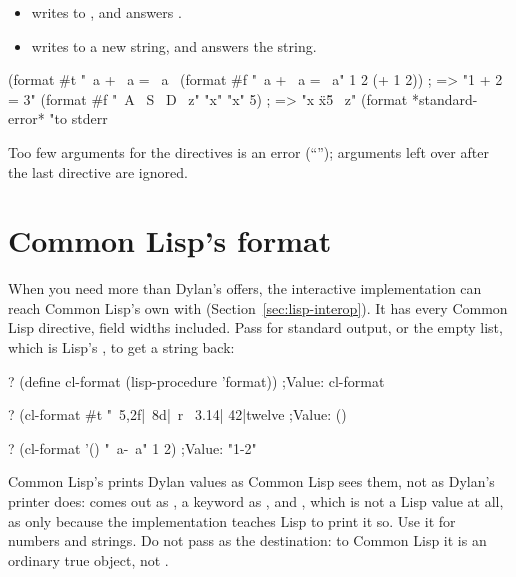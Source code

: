 \begin{itemize}
\item {} writes to , and 
  answers .
\item {} writes to a new string, and  answers the
  string.
\end{itemize}

\begin{dylan}
(format #t "~a + ~a = ~a~%
(format #f "~a + ~a = ~a" 1 2 (+ 1 2))      ; => "1 + 2 = 3"
(format #f "~A ~S ~D ~z" "x" "x" 5)         ; => "x \"x\" 5 ~z"
(format *standard-error* "to stderr~%
\end{dylan}

\noindent
Too few arguments for the directives is an error
(``''); arguments left
over after the last directive are ignored.

\section{Common Lisp's format}\label{sec:printing-lisp}

When you need more than Dylan's  offers, the interactive
implementation can reach Common Lisp's own  with
(Section~\ref{sec:lisp-interop}). It has every Common Lisp directive,
field widths included. Pass  for standard output, or the empty
list, which is Lisp's , to get a string back:

\begin{repl}
? (define cl-format (lisp-procedure 'format))
;Value: cl-format

? (cl-format #t "~5,2f|~8d|~r~%
 3.14|      42|twelve
;Value: ()

? (cl-format '() "~a-~a" 1 2)
;Value: "1-2"
\end{repl}

\begin{warnbox}
Common Lisp's  prints Dylan values as Common Lisp sees
them, not as Dylan's printer does:  comes out as , a
keyword  as , and , which is not a Lisp
value at all, as  only because the implementation teaches Lisp
to print it so. Use it for numbers and strings. Do not pass 
as the destination: to Common Lisp it is an ordinary true object, not
.
\end{warnbox}
